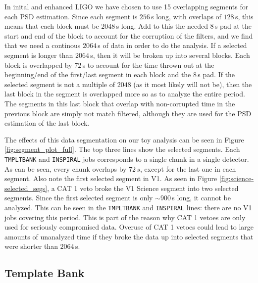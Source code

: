 In inital and enhanced \ac{LIGO} we have chosen to use 15 overlapping segments
for each \ac{PSD} estimation. Since each segment is $256\,$s long, with
overlaps of $128\,$s, this means that each block must be $2048\,$s long. Add to
this the needed $8\,$s pad at the start and end of the block to account for the
corruption of the filters, and we find that we need a continous $2064\,$s of
data in order to do the analysis. If a selected segment is longer than
$2064\,$s, then it will be broken up into several blocks. Each block is
overlapped by $72\,$s to account for the time thrown out at the beginning/end
of the first/last segment in each block and the $8\,$s pad. If the selected
segment is not a multiple of $2048$ (as it most likely will not be), then the
last block in the segment is overlapped more so as to analyze the entire
period. The segments in this last block that overlap with non-corrupted time in
the previous block are simply not match filtered, although they are used for
the \ac{PSD} estimation of the last block.

The effects of this data segmentation on our toy analysis can be seen in Figure
\ref{fig:segment_plot_full}. The top three lines show the selected segments.
Each \texttt{TMPLTBANK} and \texttt{INSPIRAL} jobs corresponds to a single
chunk in a single detector. As can be seen, every chunk overlaps by $72\,s$,
except for the last one in each segment. Also note the first selected segment
in V1. As seen in Figure \ref{fig:science-selected_segs}, a CAT 1 veto broke
the V1 Science segment into two selected segments. Since the first selected
segment is only $\sim900\,$s long, it cannot be analyzed. This can be seen in
the \texttt{TMPLTBANK} and \texttt{INSPIRAL} lines: there are no V1 jobs
covering this period. This is part of the reason why CAT 1 vetoes are only used
for seriously compromised data. Overuse of CAT 1 vetoes could lead to large
amounts of unanalyzed time if they broke the data up into selected segments
that were shorter than $2064\,$s.

\subsection{Template Bank}
\label{sec:tmpltbank}

